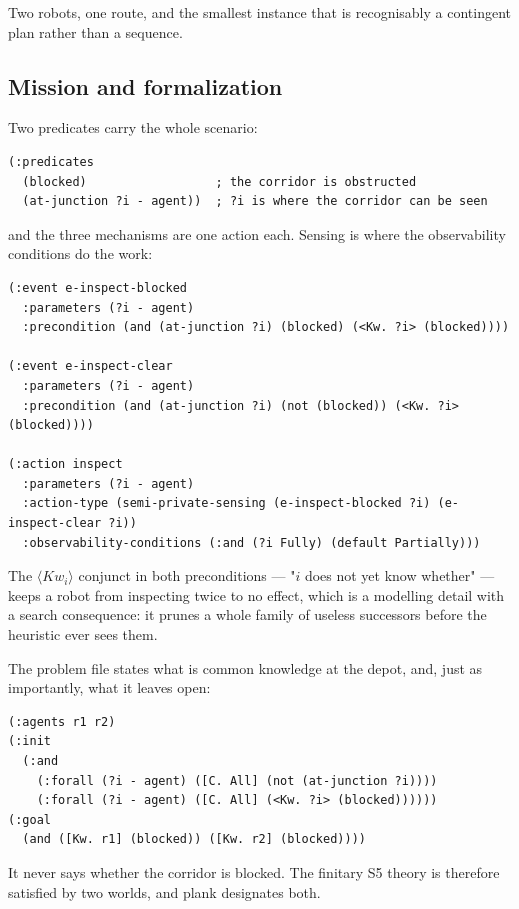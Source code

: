 \documentclass[11pt,a4paper]{article}
\newcommand{\Kw}{\mathit{Kw}}
\begin{document}
Two robots, one route, and the smallest instance that is recognisably a
contingent plan rather than a sequence.

\subsection{Mission and formalization}

Two predicates carry the whole scenario:

\begin{lstlisting}
(:predicates
  (blocked)                  ; the corridor is obstructed
  (at-junction ?i - agent))  ; ?i is where the corridor can be seen
\end{lstlisting}

\noindent
and the three mechanisms are one action each. Sensing is where the observability
conditions do the work:

\begin{lstlisting}
(:event e-inspect-blocked
  :parameters (?i - agent)
  :precondition (and (at-junction ?i) (blocked) (<Kw. ?i> (blocked))))

(:event e-inspect-clear
  :parameters (?i - agent)
  :precondition (and (at-junction ?i) (not (blocked)) (<Kw. ?i> (blocked))))

(:action inspect
  :parameters (?i - agent)
  :action-type (semi-private-sensing (e-inspect-blocked ?i) (e-inspect-clear ?i))
  :observability-conditions (:and (?i Fully) (default Partially)))
\end{lstlisting}

\noindent
The $\langle \Kw_i \rangle$ conjunct in both preconditions --- "$i$ does not yet
know whether" --- keeps a robot from inspecting twice to no effect, which is a
modelling detail with a search consequence: it prunes a whole family of
useless successors before the heuristic ever sees them.

The problem file states what is common knowledge at the depot, and, just as
importantly, what it leaves open:

\begin{lstlisting}
(:agents r1 r2)
(:init
  (:and
    (:forall (?i - agent) ([C. All] (not (at-junction ?i))))
    (:forall (?i - agent) ([C. All] (<Kw. ?i> (blocked))))))
(:goal
  (and ([Kw. r1] (blocked)) ([Kw. r2] (blocked))))
\end{lstlisting}

\noindent
It never says whether the corridor is blocked. The finitary S5 theory is
therefore satisfied by two worlds, and \textsf{plank} designates both.
\end{document}

